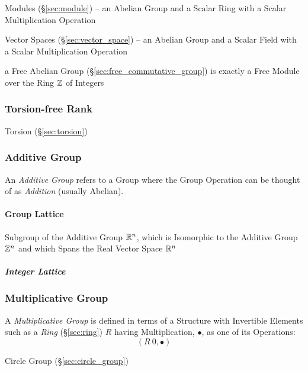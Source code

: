 \fist Modules (\S\ref{sec:module}) -- an Abelian Group and a Scalar Ring with a
Scalar Multiplication Operation

\fist Vector Spaces (\S\ref{sec:vector_space}) -- an Abelian Group and a Scalar
Field with a Scalar Multiplication Operation

\fist a Free Abelian Group (\S\ref{sec:free_commutative_group}) is exactly a
Free Module over the Ring $\mathbb{Z}$ of Integers



\subsubsection{Torsion-free Rank}\label{sec:torsionfree_rank}

Torsion (\S\ref{sec:torsion})



\subsubsection{Additive Group}\label{sec:additive_group}

An \emph{Additive Group} refers to a Group where the Group Operation
can be thought of as \emph{Addition} (usually Abelian).



\paragraph{Group Lattice}\label{sec:group_lattice}\hfill

Subgroup of the Additive Group $\mathbb{R}^n$, which is Isomorphic to the Additive
Group $\mathbb{Z}^n$ and which Spans the Real Vector Space $\mathbb{R}^n$



\subparagraph{Integer Lattice}\label{sec:integer_lattice}\hfill



\subsubsection{Multiplicative Group}\label{sec:multiplicative_group}

A \emph{Multiplicative Group} is defined in terms of a Structure with
Invertible Elements such as a \emph{Ring} (\S\ref{sec:ring}) $R$
having Multiplication, $\bullet$, as one of its Operations:
\[
  (R \ {0}, \bullet)
\]

Circle Group (\S\ref{sec:circle_group})



